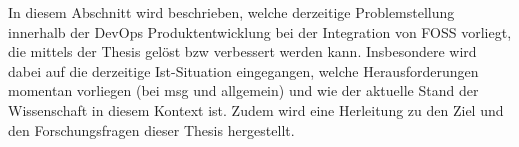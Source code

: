 In diesem Abschnitt wird beschrieben, welche derzeitige Problemstellung innerhalb der DevOps Produktentwicklung bei der Integration von FOSS vorliegt, die mittels der Thesis gelöst bzw verbessert werden kann. Insbesondere wird dabei auf die derzeitige Ist-Situation eingegangen, welche Herausforderungen momentan vorliegen (bei msg und allgemein) und wie der aktuelle Stand der Wissenschaft in diesem Kontext ist. 
Zudem wird eine Herleitung zu den Ziel und den Forschungsfragen dieser Thesis hergestellt.  